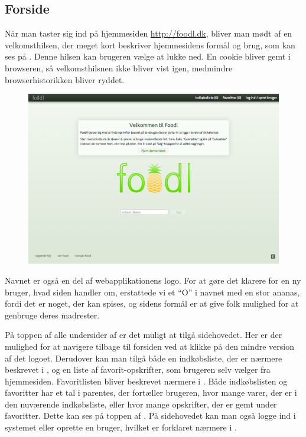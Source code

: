 \subsection{Forside}
\label{subsec:brug-forside}

Når man taster sig ind på hjemmesiden \url{http://foodl.dk}, bliver man mødt af en velkomsthilsen, der meget kort beskriver hjemmesidens formål og brug, som kan ses på . Denne hilsen kan brugeren vælge at lukke ned. En cookie bliver gemt i browseren, så velkomsthilsnen ikke bliver vist igen, medmindre browserhistorikken bliver ryddet.

\begin{figure}[H]
	\centering
	\includegraphics[scale=0.3]{billeder/foodl/thumbnails/forside.png}
	\label{fig:overblik-forside}
\end{figure}

Navnet \Foodl{} er også en del af webapplikationens logo. For at gøre det klarere for en ny bruger, hvad siden handler om, erstattede vi et ``O'' i navnet med en stor ananas, fordi det er noget, der kan spises, og sidens formål er at give folk mulighed for at genbruge deres madrester. 

På toppen af alle undersider af \Foodl{} er det muligt at tilgå sidehovedet. Her er der mulighed for at navigere tilbage til forsiden ved at klikke på den mindre version af det logoet. Derudover kan man tilgå både en indkøbsliste, der er nærmere beskrevet i , og en liste af favorit-opskrifter, som brugeren selv vælger fra hjemmesiden. Favoritlisten bliver beskrevet nærmere i . Både indkøbslisten og favoritter har et tal i parentes, der fortæller brugeren, hvor mange varer, der er i den nuværende indkøbsliste, eller hvor mange opskrifter, der er gemt under favoritter. Dette kan ses på toppen af . På sidehovedet kan man også logge ind i systemet eller oprette en bruger, hvilket er forklaret nærmere i .

